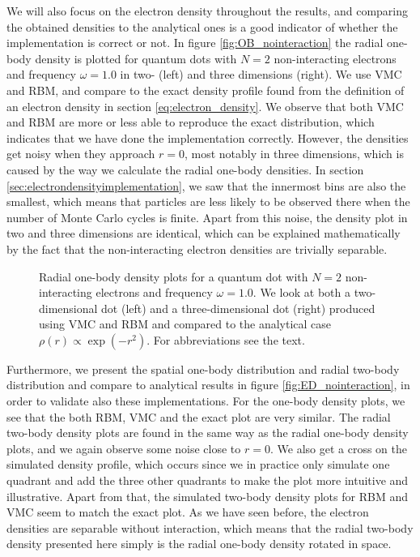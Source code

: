 We will also focus on the electron density throughout the results, and comparing the obtained densities to the analytical ones is a good indicator of whether the implementation is correct or not. In figure \eqref{fig:OB_nointeraction} the radial one-body density is plotted for quantum dots with $N=2$ non-interacting electrons and frequency $\omega=1.0$ in two- (left) and three dimensions (right). We use VMC and RBM, and compare to the exact density profile found from the definition of an electron density in section \eqref{eq:electron_density}. We observe that both VMC and RBM are more or less able to reproduce the exact distribution, which indicates that we have done the implementation correctly. However, the densities get noisy when they approach $r=0$, most notably in three dimensions, which is caused by the way we calculate the radial one-body densities. In section \ref{sec:electrondensityimplementation}, we saw that the innermost bins are also the smallest, which means that particles are less likely to be observed there when the number of Monte Carlo cycles is finite. Apart from this noise, the density plot in two and three dimensions are identical, which can be explained mathematically by the fact that the non-interacting electron densities are trivially separable.

\begin{figure}
	\centering
	\captionsetup[subfigure]{labelformat=empty}
	\caption{Radial one-body density plots for a quantum dot with $N=2$ non-interacting electrons and frequency $\omega=1.0$. We look at both a two-dimensional dot (left) and a three-dimensional dot (right) produced using VMC and RBM and compared to the analytical case $\rho(r)\propto\exp(-r^2)$. For abbreviations see the text.}
	\label{fig:OB_nointeraction}
\end{figure}

Furthermore, we present the spatial one-body distribution and radial two-body distribution and compare to analytical results in figure \eqref{fig:ED_nointeraction}, in order to validate also these implementations. For the one-body density plots, we see that the both RBM, VMC and the exact plot are very similar. The radial two-body density plots are found in the same way as the radial one-body density plots, and we again observe some noise close to $r=0$. We also get a cross on the simulated density profile, which occurs since we in practice only simulate one quadrant and add the three other quadrants to make the plot more intuitive and illustrative. Apart from that, the simulated two-body density plots for RBM and VMC seem to match the exact plot. As we have seen before, the electron densities are separable without interaction, which means that the radial two-body density presented here simply is the radial one-body density rotated in space. 

